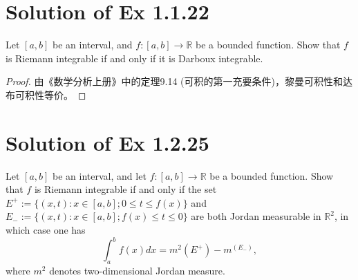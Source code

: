 \documentclass[reqno,a4paper,14pt]{amsart}
\begin{document}
\section{Solution of Ex 1.1.22}\label{22}
Let $[a,b]$ be an interval, and $f:[a,b]\to \mathbb{R}$ be a bounded function. Show that $f$ is Riemann integrable if and only if it is Darboux integrable.
\begin{proof}
    由《数学分析上册》中的定理9.14 (可积的第一充要条件)，黎曼可积性和达布可积性等价。
\end{proof}


\section{Solution of Ex 1.2.25}\label{25}
Let $[a,b]$ be an interval, and let $f:[a,b]\to \mathbb{R}$ be a bounded function. Show that $f$ is Riemann integrable if and only if the set $E^+ :=\{(x,t):x\in [a,b];0\leq t\leq f(x)\}$ and $E_{-}:=\{(x,t):x\in [a,b];f(x)\leq t\leq 0\}$ are both Jordan measurable in $\mathbb{R}^2$, in which case one has
\begin{equation*}
    \int_a^b f(x)dx =m^2(E^+)-m^(E_-),
\end{equation*}
where $m^2$ denotes two-dimensional Jordan measure.
\end{document}

